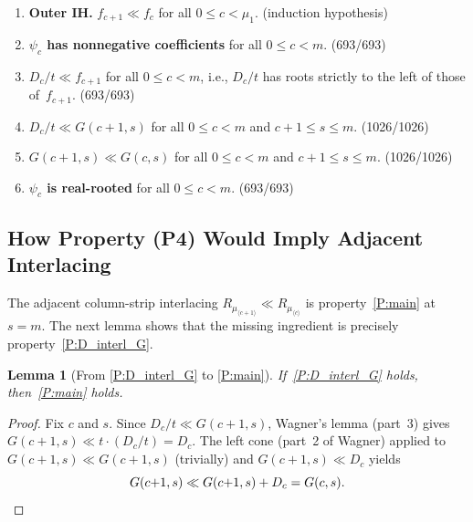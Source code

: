 \documentclass[11pt,reqno]{amsart}
\newtheorem{lemma}[theorem]{Lemma}
\theoremstyle{definition}
\newcommand{\interl}{\ll}
\begin{document}
\begin{enumerate}[label=(P\arabic*)]
\item\label{P:ih} \textbf{Outer IH.}
  $f_{c+1} \interl f_c$ for all $0 \leq c < \mu_1$.
  \hfill{(induction hypothesis)}

\item\label{P:psi_nonneg} \textbf{$\psi_c$ has nonnegative coefficients}
  for all $0 \leq c < m$.
  \hfill{(693/693)}

\item\label{P:D_interl_f} \textbf{$D_c/t \interl f_{c+1}$}
  for all $0 \leq c < m$, i.e., $D_c/t$ has roots
  strictly to the left of those of~$f_{c+1}$.
  \hfill{(693/693)}

\item\label{P:D_interl_G} \textbf{$D_c/t \interl G(c{+}1, s)$}
  for all $0 \leq c < m$ and $c{+}1 \leq s \leq m$.
  \hfill{(1026/1026)}

\item\label{P:main} \textbf{$G(c{+}1, s) \interl G(c, s)$}
  for all $0 \leq c < m$ and $c{+}1 \leq s \leq m$.
  \hfill{(1026/1026)}

\item\label{P:psi_rr} \textbf{$\psi_c$ is real-rooted}
  for all $0 \leq c < m$.
  \hfill{(693/693)}
\end{enumerate}

\subsection{How Property (P4) Would Imply Adjacent Interlacing}

The adjacent column-strip interlacing
$R_{\mu_{\langle c+1 \rangle}} \interl R_{\mu_{\langle c \rangle}}$
is property~\ref{P:main} at $s = m$.
The next lemma shows that the missing ingredient is precisely
property~\ref{P:D_interl_G}.

\begin{lemma}[From \ref{P:D_interl_G} to \ref{P:main}]\label{lem:P4_implies_P5}
If~\ref{P:D_interl_G} holds, then~\ref{P:main} holds.
\end{lemma}
\begin{proof}
Fix $c$ and $s$.
Since $D_c/t \interl G(c{+}1, s)$,
Wagner's lemma (part~3) gives
$G(c{+}1, s) \interl t \cdot (D_c/t) = D_c$.
The left cone (part~2 of Wagner) applied to
$G(c{+}1, s) \interl G(c{+}1, s)$ (trivially)
and $G(c{+}1, s) \interl D_c$ yields
\[
  G(c{+}1, s) \interl G(c{+}1, s) + D_c = G(c, s). \qedhere
\]
\end{proof}
\end{document}
